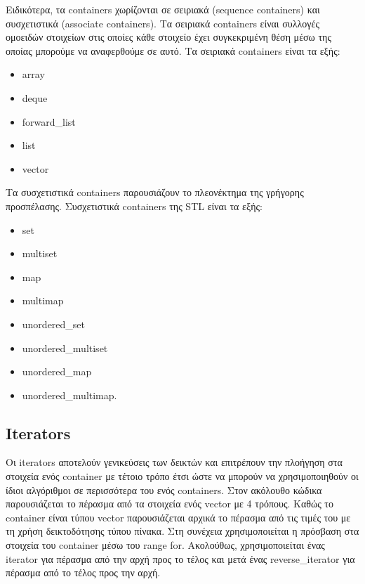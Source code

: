 



Ειδικότερα, τα containers χωρίζονται σε σειριακά (sequence containers) και συσχετιστικά (associate containers). Τα σειριακά containers είναι συλλογές ομοειδών στοιχείων στις οποίες κάθε στοιχείο  έχει συγκεκριμένη θέση μέσω της οποίας μπορούμε να αναφερθούμε σε αυτό. Τα σειριακά containers είναι τα εξής: 
\begin{itemize}[noitemsep]
\item array 
\item deque
\item forward\_list 
\item list 
\item vector
\end{itemize}

Τα συσχετιστικά containers παρουσιάζουν το πλεονέκτημα της γρήγορης προσπέλασης. Συσχετιστικά containers της STL είναι τα εξής: 
\begin{itemize}[noitemsep]
\item set 
\item multiset
\item map
\item multimap
\item unordered\_set
\item unordered\_multiset
\item unordered\_map 
\item unordered\_multimap. 
\end{itemize}

\subsection{Iterators}
Οι iterators αποτελούν γενικεύσεις των δεικτών και επιτρέπουν την πλοήγηση στα στοιχεία ενός container με τέτοιο τρόπο έτσι ώστε να μπορούν να χρησιμοποιηθούν οι ίδιοι αλγόριθμοι σε περισσότερα του ενός containers. Στον ακόλουθο κώδικα παρουσιάζεται το πέρασμα από τα στοιχεία ενός vector με 4  τρόπους. Καθώς το container είναι τύπου vector παρουσιάζεται αρχικά το πέρασμα από τις τιμές του με τη χρήση δεικτοδότησης τύπου πίνακα. Στη συνέχεια χρησιμοποιείται η πρόσβαση στα στοιχεία του container μέσω του range for. Ακολούθως, χρησιμοποιείται ένας iterator για πέρασμα από την αρχή προς το τέλος και μετά ένας reverse\_iterator για πέρασμα από το τέλος προς την αρχή. 

